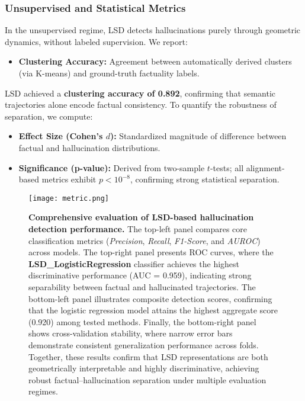 \documentclass[11pt]{article}
\begin{document}
\subsubsection{Unsupervised and Statistical Metrics}

In the unsupervised regime, LSD detects hallucinations purely through geometric dynamics, without labeled supervision.  
We report:
\begin{itemize}[leftmargin=*]
    \item \textbf{Clustering Accuracy:} Agreement between automatically derived clusters (via K-means) and ground-truth factuality labels.
\end{itemize}

LSD achieved a \textbf{clustering accuracy of 0.892}, confirming that semantic trajectories alone encode factual consistency.  
To quantify the robustness of separation, we compute:
\begin{itemize}[leftmargin=*]
    \item \textbf{Effect Size (Cohen’s $d$):} Standardized magnitude of difference between factual and hallucination distributions.
    \item \textbf{Significance (p-value):} Derived from two-sample $t$-tests; all alignment-based metrics exhibit $p < 10^{-8}$, confirming strong statistical separation.
\end{itemize}


\begin{figure}[t]
\centering
\texttt{[image: metric.png]}
\caption{\textbf{Comprehensive evaluation of LSD-based hallucination detection performance.} 
The top-left panel compares core classification metrics (\textit{Precision}, \textit{Recall}, \textit{F1-Score}, and \textit{AUROC}) across models. 
The top-right panel presents ROC curves, where the \textbf{LSD\_LogisticRegression} classifier achieves the highest discriminative performance (AUC = 0.959), indicating strong separability between factual and hallucinated trajectories. 
The bottom-left panel illustrates composite detection scores, confirming that the logistic regression model attains the highest aggregate score (0.920) among tested methods. 
Finally, the bottom-right panel shows cross-validation stability, where narrow error bars demonstrate consistent generalization performance across folds.
Together, these results confirm that LSD representations are both geometrically interpretable and highly discriminative, achieving robust factual–hallucination separation under multiple evaluation regimes.}
\label{fig:metric}
\end{figure}
\end{document}
